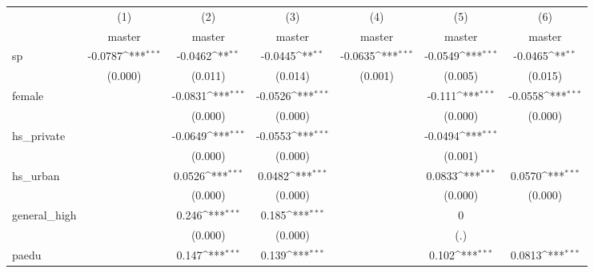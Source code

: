 {
\def\sym#1{\ifmmode^{#1}\else\(^{#1}\)\fi}
\begin{tabular}{l*{6}{c}}
\hline\hline
            &\multicolumn{1}{c}{(1)}&\multicolumn{1}{c}{(2)}&\multicolumn{1}{c}{(3)}&\multicolumn{1}{c}{(4)}&\multicolumn{1}{c}{(5)}&\multicolumn{1}{c}{(6)}\\
            &\multicolumn{1}{c}{master}&\multicolumn{1}{c}{master}&\multicolumn{1}{c}{master}&\multicolumn{1}{c}{master}&\multicolumn{1}{c}{master}&\multicolumn{1}{c}{master}\\
\hline
sp          &     -0.0787\sym{***}&     -0.0462\sym{**} &     -0.0445\sym{**} &     -0.0635\sym{***}&     -0.0549\sym{***}&     -0.0465\sym{**} \\
            &     (0.000)         &     (0.011)         &     (0.014)         &     (0.001)         &     (0.005)         &     (0.015)         \\
[1em]
female      &                     &     -0.0831\sym{***}&     -0.0526\sym{***}&                     &      -0.111\sym{***}&     -0.0558\sym{***}\\
            &                     &     (0.000)         &     (0.000)         &                     &     (0.000)         &     (0.000)         \\
[1em]
hs\_private  &                     &     -0.0649\sym{***}&     -0.0553\sym{***}&                     &     -0.0494\sym{***}&                     \\
            &                     &     (0.000)         &     (0.000)         &                     &     (0.001)         &                     \\
[1em]
hs\_urban    &                     &      0.0526\sym{***}&      0.0482\sym{***}&                     &      0.0833\sym{***}&      0.0570\sym{***}\\
            &                     &     (0.000)         &     (0.000)         &                     &     (0.000)         &     (0.000)         \\
[1em]
general\_high&                     &       0.246\sym{***}&       0.185\sym{***}&                     &           0         &                     \\
            &                     &     (0.000)         &     (0.000)         &                     &         (.)         &                     \\
[1em]
paedu       &                     &       0.147\sym{***}&       0.139\sym{***}&                     &       0.102\sym{***}&      0.0813\sym{***}\\

\end{tabular}}

